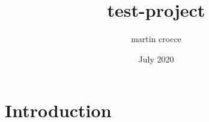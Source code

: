 \documentclass{article}
\title{test-project}
\author{martin crocce}
\date{July 2020}
\begin{document}
\maketitle

\section{Introduction}
\end{document}
